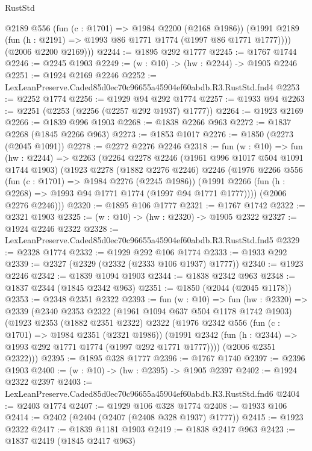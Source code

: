 \begin{lexlean}{RustStd}
\begin{coremodule}
          @2189
          @556
          (fun (c : @1701) => @1984 @2200 (@2168 @1986))
          (@1991 @2189 (fun (h : @2191) => @1993 @86 @1771 @1774 (@1997 @86 @1771 @1777))))
        (@2006 @2200 @2169)))
@2244 := @1895 @292 @1777
@2245 := @1767 @1744
@2246 := @2245 @1903
@2249 := (w : @10) -> (hw : @2244) -> @1905 @2246
@2251 := @1924 @2169 @2246
@2252 := LexLeanPreserve.Caded85d0ec70c96655a45904ef60abdb.R3.RustStd.fnd4
@2253 := @2252 @1774
@2256 := @1929 @94 @292 @1774
@2257 := @1933 @94
@2263 := @2251 (@2253 (@2256 (@2257 @292 @1937) @1777))
@2264 := @1923 @2169
@2266 := @1839 @996 @1903
@2268 := @1838 @2266 @963
@2272 := @1837 @2268 (@1845 @2266 @963)
@2273 := @1853 @1017
@2276 := @1850 (@2273 (@2045 @1091))
@2278 := @2272 @2276 @2246
@2318 := fun (w : @10) =>
  fun (hw : @2244) =>
  @2263
    (@2264
      @2278
      @2246
      (@1961 @996 @1017 @504 @1091 @1744 @1903)
      (@1923
        @2278
        (@1882 @2276 @2246)
        @2246
        (@1976
          @2266
          @556
          (fun (c : @1701) => @1984 @2276 (@2245 @1986))
          (@1991 @2266 (fun (h : @2268) => @1993 @94 @1771 @1774 (@1997 @94 @1771 @1777))))
        (@2006 @2276 @2246)))
@2320 := @1895 @106 @1777
@2321 := @1767 @1742
@2322 := @2321 @1903
@2325 := (w : @10) -> (hw : @2320) -> @1905 @2322
@2327 := @1924 @2246 @2322
@2328 := LexLeanPreserve.Caded85d0ec70c96655a45904ef60abdb.R3.RustStd.fnd5
@2329 := @2328 @1774
@2332 := @1929 @292 @106 @1774
@2333 := @1933 @292
@2339 := @2327 (@2329 (@2332 (@2333 @106 @1937) @1777))
@2340 := @1923 @2246
@2342 := @1839 @1094 @1903
@2344 := @1838 @2342 @963
@2348 := @1837 @2344 (@1845 @2342 @963)
@2351 := @1850 (@2044 (@2045 @1178))
@2353 := @2348 @2351 @2322
@2393 := fun (w : @10) =>
  fun (hw : @2320) =>
  @2339
    (@2340
      @2353
      @2322
      (@1961 @1094 @637 @504 @1178 @1742 @1903)
      (@1923
        @2353
        (@1882 @2351 @2322)
        @2322
        (@1976
          @2342
          @556
          (fun (c : @1701) => @1984 @2351 (@2321 @1986))
          (@1991 @2342 (fun (h : @2344) => @1993 @292 @1771 @1774 (@1997 @292 @1771 @1777))))
        (@2006 @2351 @2322)))
@2395 := @1895 @328 @1777
@2396 := @1767 @1740
@2397 := @2396 @1903
@2400 := (w : @10) -> (hw : @2395) -> @1905 @2397
@2402 := @1924 @2322 @2397
@2403 := LexLeanPreserve.Caded85d0ec70c96655a45904ef60abdb.R3.RustStd.fnd6
@2404 := @2403 @1774
@2407 := @1929 @106 @328 @1774
@2408 := @1933 @106
@2414 := @2402 (@2404 (@2407 (@2408 @328 @1937) @1777))
@2415 := @1923 @2322
@2417 := @1839 @1181 @1903
@2419 := @1838 @2417 @963
@2423 := @1837 @2419 (@1845 @2417 @963)

\end{coremodule}
\end{lexlean}

